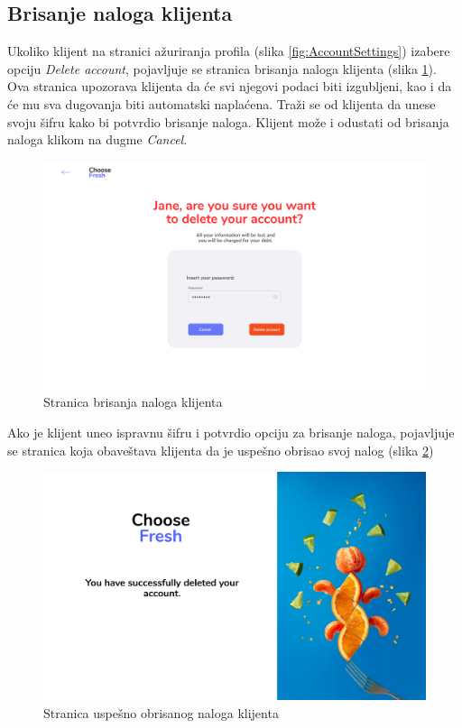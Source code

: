 \subsection{Brisanje naloga klijenta}

Ukoliko klijent na stranici ažuriranja profila (slika \ref{fig:AccountSettings}) izabere opciju \textit{Delete account}, pojavljuje se stranica brisanja naloga klijenta (slika \ref{fig:DeleteAccount}). Ova stranica upozorava klijenta da će svi njegovi podaci biti izgubljeni, kao i da će mu sva dugovanja biti automatski naplaćena. Traži se od klijenta da unese svoju šifru kako bi potvrdio brisanje naloga. Klijent može i odustati od brisanja naloga klikom na dugme \textit{Cancel}.
\begin{figure}[H]
	\begin{center}
		\includegraphics[width=\textwidth]{UI/DeleteAccount.png}
    		\caption{Stranica brisanja naloga klijenta}
    \label{fig:DeleteAccount}
    \end{center}
\end{figure}

Ako je klijent uneo ispravnu šifru i potvrdio opciju za brisanje naloga, pojavljuje se stranica koja obaveštava klijenta da je uspešno obrisao svoj nalog (slika \ref{fig:DeleteAccountSuccessful})

\begin{figure}[H]
	\begin{center}
		\includegraphics[width=\textwidth]{UI/DeleteAccountSuccessful.png}
    		\caption{Stranica uspešno obrisanog naloga klijenta}
    \label{fig:DeleteAccountSuccessful}
    \end{center}
\end{figure}